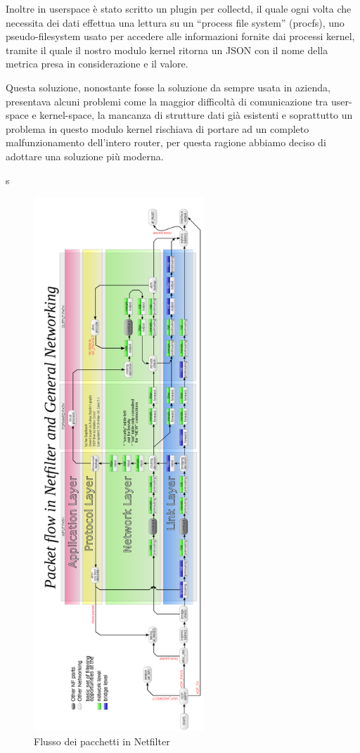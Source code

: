 Inoltre in userspace è stato scritto un plugin per collectd, il quale ogni volta che necessita dei dati effettua una lettura su un ``process file system'' (procfs), uno pseudo-filesystem usato per accedere alle informazioni fornite dai processi kernel, tramite il quale il nostro modulo kernel ritorna un JSON con il nome della metrica presa in considerazione e il valore.

Questa soluzione, nonostante fosse la soluzione da sempre usata in azienda, presentava alcuni problemi come la maggior difficoltà di comunicazione tra user-space e kernel-space, la mancanza di strutture dati già esistenti e soprattutto un problema in questo modulo kernel rischiava di portare ad un completo malfunzionamento dell'intero router, per questa ragione abbiamo deciso di adottare una soluzione più moderna.

s
\begin{figure}[hbtp]
    \label{fig:netfilter}
    \begin{center}
        \includegraphics[height=570pt]{images/mitigazione/netfilter.png}
    \end{center}

    \caption{Flusso dei pacchetti in Netfilter}
    \centering
\end{figure}  



